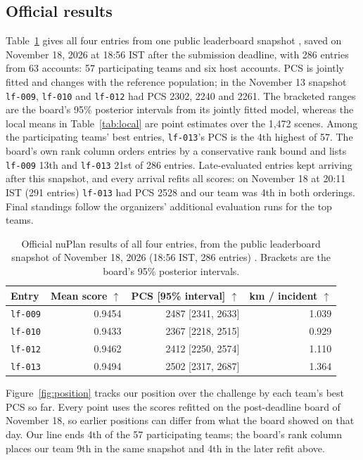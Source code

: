 \documentclass{article}
\newcommand{\lf}{\texttt{lf-009}}
\begin{document}
\subsection{Official results}\label{sec:official}
Table~\ref{tab:official} gives all four entries from one public leaderboard snapshot \cite{board}, saved on November 18, 2026 at 18:56 IST after the submission deadline, with 286 entries from 63 accounts: 57 participating teams and six host accounts. PCS is jointly fitted and changes with the reference population; in the November 13 snapshot \lf{}, \texttt{lf-010} and \texttt{lf-012} had PCS 2302, 2240 and 2261. The bracketed ranges are the board's 95\% posterior intervals from its jointly fitted model, whereas the local means in Table~\ref{tab:local} are point estimates over the 1,472 scenes. Among the participating teams' best entries, \texttt{lf-013}'s PCS is the 4th highest of 57. The board's own rank column orders entries by a conservative rank bound and lists \lf{} 13th and \texttt{lf-013} 21st of 286 entries. Late-evaluated entries kept arriving after this snapshot, and every arrival refits all scores: on November 18 at 20:11 IST (291 entries) \texttt{lf-013} had PCS 2528 and our team was 4th in both orderings. Final standings follow the organizers' additional evaluation runs for the top teams.

\begin{table}[htbp]
\centering\small
\caption{Official nuPlan results of all four entries, from the public leaderboard snapshot of November 18, 2026 (18:56 IST, 286 entries) \cite{board}. Brackets are the board's 95\% posterior intervals.}\label{tab:official}
\begin{tabular}{lrrr}
\toprule
Entry & Mean score $\uparrow$ & PCS [95\% interval] $\uparrow$ & km / incident $\uparrow$ \\
\midrule
\lf{} & 0.9454 & 2487 [2341, 2633] & 1.039 \\
\texttt{lf-010} & 0.9433 & 2367 [2218, 2515] & 0.929 \\
\texttt{lf-012} & 0.9462 & 2412 [2250, 2574] & 1.110 \\
\texttt{lf-013} & 0.9494 & 2502 [2317, 2687] & 1.364 \\
\bottomrule
\end{tabular}
\end{table}

Figure~\ref{fig:position} tracks our position over the challenge by each team's best PCS so far. Every point uses the scores refitted on the post-deadline board of November 18, so earlier positions can differ from what the board showed on that day. Our line ends 4th of the 57 participating teams; the board's rank column places our team 9th in the same snapshot and 4th in the later refit above.
\end{document}
